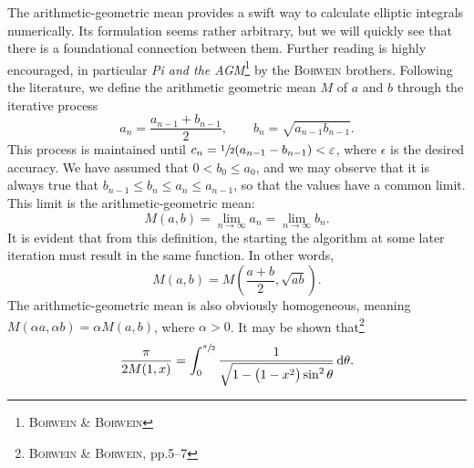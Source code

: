 The arithmetic-geometric mean provides a swift way to calculate elliptic integrals numerically.
Its formulation seems rather arbitrary, but we will quickly see that there is a foundational connection between them.
Further reading is highly encouraged, in particular \emph{Pi and the AGM}\footnote{\cite{borwein1987pi} \textsc{Borwein} \& \textsc{Borwein}} by the \textsc{Borwein} brothers.
Following the literature, we define the arithmetic geometric mean $M$ of $a$ and $b$ through the iterative process
\[
a_{n} = \frac{a_{n-1} + b_{n-1}}{2}, \qquad b_{n} = \sqrt{a_{n-1} b_{n-1}}.
\]
This process is maintained until $c_{n} = \sfrac{1}{2}(a_{n-1} - b_{n-1}) < \varepsilon$, where $\epsilon$ is the desired accuracy.
We have assumed that $0 < b_0 \leq a_0$, and we may observe that it is always true that $b_{n-1} \leq b_n \leq a_n \leq a_{n-1}$, so that the values have a common limit.
This limit is the arithmetic-geometric mean:
\[
M(a, b) = \lim_{n \to \infty} a_n = \lim_{n \to \infty} b_n.
\]
It is evident that from this definition, the starting the algorithm at some later iteration must result in the same function.
In other words,
\[
M(a, b) = M{\left( \frac{a + b}{2}, \sqrt{ab} \right)}.
\]
The arithmetic-geometric mean is also obviously homogeneous, meaning $M(\alpha a, \alpha b) = \alpha M(a,b)$, where $\alpha > 0$.
It may be shown that\footnote{\cite{borwein1987pi} \textsc{Borwein} \& \textsc{Borwein}, pp.5--7}
\[
\frac{\pi}{2 M(1, x)} = \int_{0}^{\sfrac{\pi}{2}} \frac{1}{\sqrt{1 - \big( 1 - x^2\big)\sin^2{\theta}}} \,\mathrm{d}\theta.
\]
